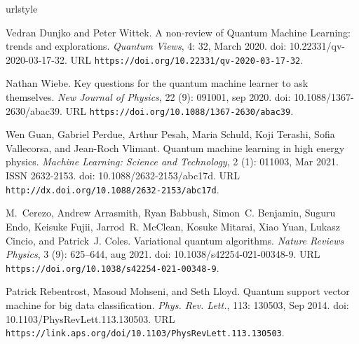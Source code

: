\documentclass[letterpaper,preprintnumbers,preprint,aps,accepted=2022-05-26]{quantumarticle}
\begin{document}
\begin{thebibliography}{39}
\providecommand{\natexlab}[1]{#1}
\providecommand{\url}[1]{\texttt{#1}}
\expandafter\ifx\csname urlstyle\endcsname\relax
  \providecommand{\doi}[1]{doi: #1}\else
  \providecommand{\doi}{doi: \begingroup \urlstyle{rm}\Url}\fi

Vedran Dunjko and Peter Wittek.
\newblock A non-review of {Q}uantum {M}achine {L}earning: trends and
  explorations.
\newblock \emph{{Quantum Views}}, 4: 32, March 2020.
\newblock \doi{10.22331/qv-2020-03-17-32}.
\newblock URL \url{https://doi.org/10.22331/qv-2020-03-17-32}.

Nathan Wiebe.
\newblock Key questions for the quantum machine learner to ask themselves.
\newblock \emph{New Journal of Physics}, 22 (9): 091001, sep
  2020.
\newblock \doi{10.1088/1367-2630/abac39}.
\newblock URL \url{https://doi.org/10.1088/1367-2630/abac39}.

Wen Guan, Gabriel Perdue, Arthur Pesah, Maria Schuld, Koji Terashi, Sofia
  Vallecorsa, and Jean-Roch Vlimant.
\newblock Quantum machine learning in high energy physics.
\newblock \emph{Machine Learning: Science and Technology}, 2
  (1): 011003, Mar 2021.
\newblock ISSN 2632-2153.
\newblock \doi{10.1088/2632-2153/abc17d}.
\newblock URL \url{http://dx.doi.org/10.1088/2632-2153/abc17d}.

M.~Cerezo, Andrew Arrasmith, Ryan Babbush, Simon~C. Benjamin, Suguru Endo,
  Keisuke Fujii, Jarrod~R. McClean, Kosuke Mitarai, Xiao Yuan, Lukasz Cincio,
  and Patrick~J. Coles.
\newblock Variational quantum algorithms.
\newblock \emph{Nature Reviews Physics}, 3 (9): 625--644, aug
  2021.
\newblock \doi{10.1038/s42254-021-00348-9}.
\newblock URL \url{https://doi.org/10.1038/s42254-021-00348-9}.

Patrick Rebentrost, Masoud Mohseni, and Seth Lloyd.
\newblock Quantum support vector machine for big data classification.
\newblock \emph{Phys. Rev. Lett.}, 113: 130503, Sep 2014.
\newblock \doi{10.1103/PhysRevLett.113.130503}.
\newblock URL \url{https://link.aps.org/doi/10.1103/PhysRevLett.113.130503}.


\end{thebibliography}
\end{document}
